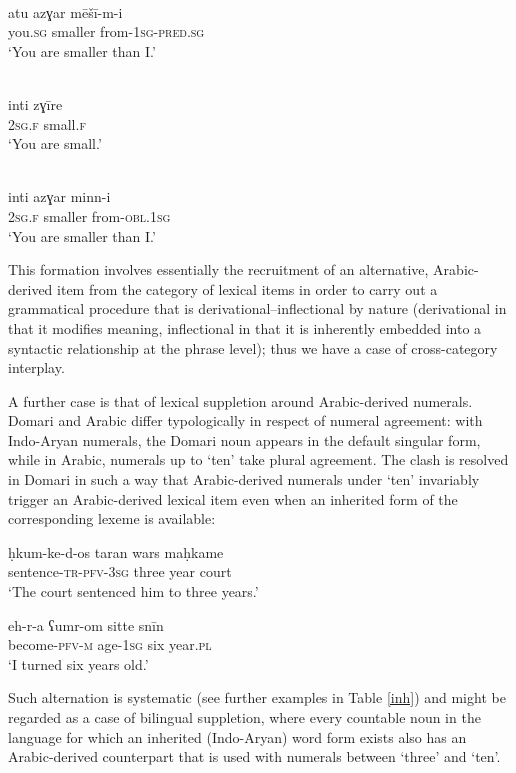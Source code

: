 \documentclass[output=paper]{langsci/langscibook}
\begin{document}
\ex
{}\\
\gll atu azɣar mēšī-m-i    \\
           you.\textsc{sg} smaller from-\textsc{1sg-pred.sg}\\
\glt       ‘You are smaller than I.’

\ex
{}\\
\gll inti zɣīre    \\
           \textsc{2sg.f} small.\textsc{f}\\
\glt       ‘You are small.’

\ex
{}\\
\gll inti azɣar minn-i    \\
           \textsc{2sg.f} smaller from-\textsc{obl.1sg}\\
\glt       ‘You are smaller than I.’
\z
\z


This formation involves essentially the recruitment of an alternative, Arabic-derived item from the category of lexical items in order to carry out a grammatical procedure that is derivational–inflectional by nature (derivational in that it modifies meaning, inflectional in that it is inherently embedded into a syntactic relationship at the phrase level); thus we have a case of cross-category interplay.

A further case is that of lexical suppletion around Arabic-derived numerals. Domari and Arabic differ typologically in respect of numeral agreement: with Indo-Aryan numerals, the Domari noun appears in the default singular form, while in Arabic, numerals up to `ten' take plural agreement. The clash is resolved in Domari in such a way that Arabic-derived numerals under `ten' invariably trigger an Arabic-derived lexical item even when an inherited form of the corresponding lexeme is available:

\ea
\ea
\gll ḥkum-ke-d-os taran  wars maḥkame\\
           sentence-\textsc{tr-pfv-3sg} three year court\\
\glt       ‘The court sentenced him to three years.’

\ex
\gll eh-r-a  ʕumr-om sitte snīn\\
           become-\textsc{pfv-m} age-\textsc{1sg} six year\textsc{.pl}\\
\glt       ‘I turned six years old.’
\z
\z

Such alternation is systematic (see further examples in Table \ref{inh}) and might be regarded as a case of bilingual suppletion, where every countable noun in the language for which an inherited (Indo-Aryan) word form exists also has an Arabic-derived counterpart that is used with numerals between `three' and `ten'.
\\
\end{document}
